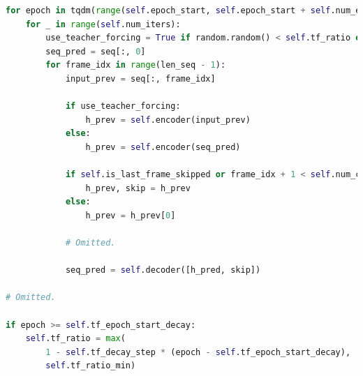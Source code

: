 \begin{lstlisting}[language=Python, caption={Python code of \textcolor{blue}{\textbf{Solver}} (some code is omitted).}, label={teacher-forcing}]
for epoch in tqdm(range(self.epoch_start, self.epoch_start + self.num_epochs)): 
    for _ in range(self.num_iters):
        use_teacher_forcing = True if random.random() < self.tf_ratio else False
        seq_pred = seq[:, 0]
        for frame_idx in range(len_seq - 1): 
            input_prev = seq[:, frame_idx]
            
            if use_teacher_forcing: 
                h_prev = self.encoder(input_prev)
            else:
                h_prev = self.encoder(seq_pred)

            if self.is_last_frame_skipped or frame_idx + 1 < self.num_cond:
                h_prev, skip = h_prev
            else:
                h_prev = h_prev[0]

            # Omitted.

            seq_pred = self.decoder([h_pred, skip])

# Omitted.

if epoch >= self.tf_epoch_start_decay: 
    self.tf_ratio = max(
        1 - self.tf_decay_step * (epoch - self.tf_epoch_start_decay), 
        self.tf_ratio_min)
\end{lstlisting}
